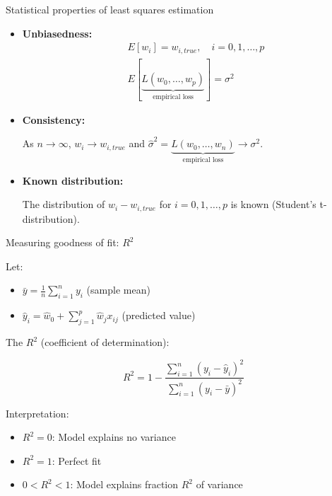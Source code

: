 \documentclass{beamer}
\begin{document}
\begin{frame}{Statistical properties of least squares estimation}

\begin{itemize}
    \item \textbf{Unbiasedness:}
    \[
    \begin{split}
    & E[w_i] = w_{i,true}, \quad i = 0, 1, \ldots, p \\
    & E[\underbrace{L(w_0, \ldots, w_p)}_{\text{empirical loss}}] = \sigma^2
    \end{split}
    \]

    \item \textbf{Consistency:}
    
    As $n \to \infty$, $w_i \to w_{i,true}$ and 
     $\hat{\sigma}^2=\underbrace{L(w_0,\ldots,w_n)}_{\text{empirical loss}} \to \sigma^2$.

    \item \textbf{Known distribution:}
    
    The distribution of $w_i - w_{i,true}$ for $i = 0, 1, \ldots, p$ is known (Student's t-distribution).

\end{itemize}

\end{frame}

\begin{frame}{Measuring goodness of fit: $R^2$}

Let:
\begin{itemize}
    \item $\bar{y} = \frac{1}{n} \sum_{i=1}^n y_i$ (sample mean)
    \item $\hat{y}_i = \hat{w}_0 + \sum_{j=1}^p \hat{w}_j x_{ij}$ (predicted value)
\end{itemize}

\vspace{0.3cm}

The $R^2$ (coefficient of determination):

\[
R^2 = 1 - \frac{\sum_{i=1}^n (y_i - \hat{y}_i)^2}{\sum_{i=1}^n (y_i - \bar{y})^2}
\]

\vspace{0.3cm}

Interpretation:

\begin{itemize}
    \item $R^2 = 0$: Model explains no variance
    \item $R^2 = 1$: Perfect fit
    \item $0 < R^2 < 1$: Model explains fraction $R^2$ of variance
\end{itemize}

\end{frame}
\end{document}
